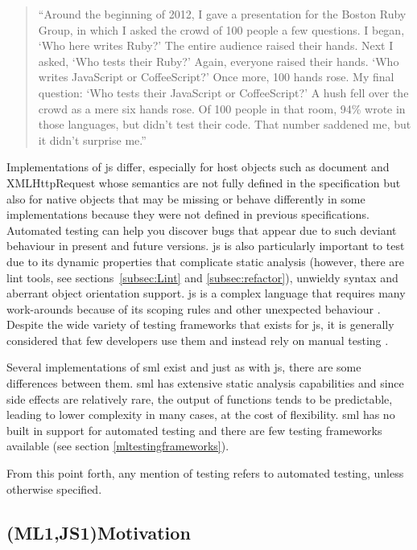 \documentclass[11pt]{article}
\begin{document}
\begin{quote}
``Around the beginning of 2012, I gave a presentation for the Boston Ruby Group, in which I asked the crowd of 100 people a few questions. I began, `Who here writes Ruby?' The entire audience raised their hands. Next I asked, `Who tests their Ruby?' Again, everyone raised their hands. `Who writes JavaScript or CoffeeScript?' Once more, 100 hands rose. My final question: `Who tests their JavaScript or CoffeeScript?' A hush fell over the crowd as a mere six hands rose. Of 100 people in that room, 94\% wrote in those languages, but didn't test their code. That number saddened me, but it didn't surprise me.''
\end{quote}

Implementations of \gls{js} differ, especially for host objects such as document and XMLHttpRequest whose semantics are not fully defined in the specification but also for native objects that may be missing or behave differently in some implementations because they were not defined in previous specifications. Automated testing can help you discover bugs that appear due to such deviant behaviour in present and future versions. \gls{js} is also particularly important to test due to its dynamic properties \cite{AutomatedTesting} that complicate static analysis (however, there are lint tools, see sections~\ref{subsec:Lint} and \ref{subsec:refactor}), unwieldy syntax and aberrant object orientation support. \gls{js} is a complex language that requires many work-arounds because of its scoping rules and other unexpected behaviour \cite[appendix A]{GoodParts}. Despite the wide variety of testing frameworks that exists for \gls{js}, it is generally considered that few developers use them and instead rely on manual testing \cite{AutomatedTesting}.

Several implementations of \gls{sml} exist and just as with \gls{js}, there are some differences between them. \gls{sml} has extensive static analysis capabilities and since side effects are relatively rare, the output of functions tends to be predictable, leading to lower complexity in many cases, at the cost of flexibility. \gls{sml} has no built in support for automated testing and there are few testing frameworks available (see section \ref{mltestingframeworks}).

From this point forth, any mention of testing refers to automated testing, unless otherwise specified.

\subsection{(ML1,JS1)Motivation}
\label{subsec:motivation}
\end{document}
